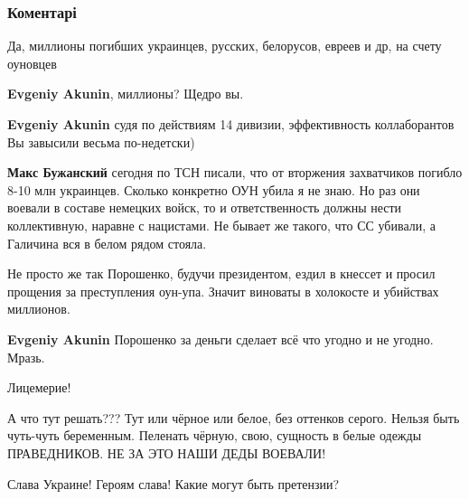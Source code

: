  
 
 
 
 
\subsubsection{Коментарі}

\begin{itemize}
Да, миллионы погибших украинцев, русских, белорусов, евреев и др, на счету оуновцев

\begin{itemize}
\textbf{Evgeniy Akunin}, миллионы? Щедро вы.

\textbf{Evgeniy Akunin} судя по действиям 14 дивизии, эффективность коллаборантов Вы завысили весьма по-недетски)

\textbf{Макс Бужанский} сегодня по ТСН писали, что от вторжения захватчиков
погибло 8-10 млн украинцев. Сколько конкретно ОУН убила я не знаю. Но раз они
воевали в составе немецких войск, то и ответственность должны нести
коллективную, наравне с нацистами. Не бывает же такого, что СС убивали, а
Галичина вся в белом рядом стояла.

Не просто же так Порошенко, будучи президентом, ездил в кнессет и просил
прощения за преступления оун-упа. Значит виноваты в холокосте и убийствах
миллионов.

\textbf{Evgeniy Akunin} Порошенко за деньги сделает всё что угодно и не угодно. Мразь.
\end{itemize}

Лицемерие!


А что тут решать??? Тут или чёрное или белое, без оттенков серого. Нельзя быть
чуть-чуть беременным. Пеленать чёрную, свою, сущность в белые одежды
ПРАВЕДНИКОВ.  НЕ ЗА ЭТО НАШИ ДЕДЫ ВОЕВАЛИ!

Слава Украине! Героям слава! Какие могут быть претензии?



\end{itemize}
